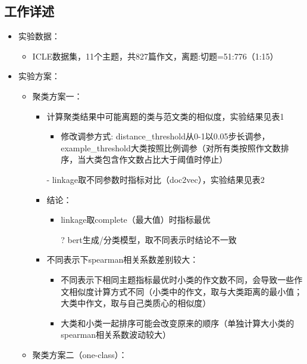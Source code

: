 \documentclass[11pt]{article}
\begin{document}
\begin{CJK}{UTF8}{gkai}
\section{工作详述}
\begin{itemize}
  \item 实验数据：
  \begin{itemize}
    \item ICLE数据集，11个主题，共827篇作文，离题:切题=51:776（1:15）
  \end{itemize}
  \item 实验方案：
  \begin{itemize}
    \item 聚类方案一：
    \begin{itemize}
      \item 计算聚类结果中可能离题的类与范文类的相似度，实验结果见表1
      \begin{itemize}
        \item 修改调参方式: distance\_threshold从0-1以0.05步长调参，example\_threshold大类按照比例调参（对所有类按照作文数排序，当大类包含作文数占比大于阈值时停止）
      \end{itemize} 
      \item [-] linkage取不同参数时指标对比（doc2vec），实验结果见表2
      \item 结论：
      \begin{itemize}
        \item linkage取complete（最大值）时指标最优
        \item [?] bert生成/分类模型，取不同表示时结论不一致
      \end{itemize}
      \item 不同表示下spearman相关系数差别较大：
      \begin{itemize}
        \item 不同表示下相同主题指标最优时小类的作文数不同，会导致一些作文相似度计算方式不同（小类中的作文，取与大类距离的最小值；大类中作文，取与自己类质心的相似度）
        \item 大类和小类一起排序可能会改变原来的顺序（单独计算大小类的spearman相关系数波动较大）
      \end{itemize}
    \end{itemize}
    \item 聚类方案二（one-class）：
    \begin{itemize}

\end{itemize}
\end{itemize}
\end{itemize}
\end{CJK}
\end{document}
